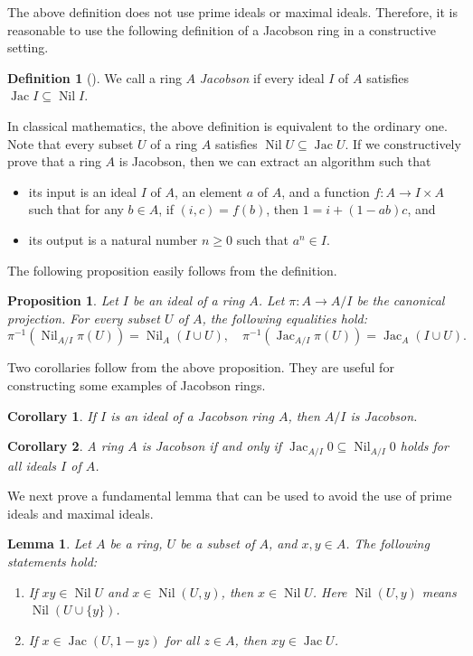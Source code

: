 \documentclass[11pt]{article}
\newtheorem{lemma}{Lemma}[section]
\newtheorem{corollary}{Corollary}[section]
\newtheorem{proposition}{Proposition}[section]
\theoremstyle{definition}
\newtheorem{definition}{Definition}[section]
\DeclareMathOperator{\Nil}{Nil}
\DeclareMathOperator{\Jac}{Jac}
\begin{document}
The above definition does not use prime ideals or maximal ideals. Therefore, it is reasonable to use the following definition of a Jacobson ring in a constructive setting.
\begin{definition}[{\cite[Section 2.4.1]{Wes18}}]
    We call a ring $A$ \emph{Jacobson} if every ideal $I$ of $A$ satisfies $\Jac I\subseteq\Nil I$.
\end{definition}
In classical mathematics, the above definition is equivalent to the ordinary one.
Note that every subset $U$ of a ring $A$ satisfies $\Nil U\subseteq\Jac U$.
If we constructively prove that a ring $A$ is Jacobson, then we can extract an algorithm such that
\begin{itemize}
    \item its input is an ideal $I$ of $A$, an element $a$ of $A$, and a function $f:A\to I\times A$ such that for any $b\in A$, if $(i,c)=f(b)$, then $1=i+(1-ab)c$, and
    \item its output is a natural number $n\ge0$ such that $a^n\in I$.
\end{itemize}
The following proposition easily follows from the definition.
\begin{proposition}\label{radical-projection}
    Let $I$ be an ideal of a ring $A$. Let $\pi:A\to A/I$ be the canonical projection. For every subset $U$ of $A$, the following equalities hold:
    \[
    \pi^{-1}(\Nil_{A/I}{\pi(U)})=\Nil_A(I\cup U),\quad \pi^{-1}(\Jac_{A/I}{\pi(U)})=\Jac_A(I\cup U).
    \]
\end{proposition}
Two corollaries follow from the above proposition. They are useful for constructing some examples of Jacobson rings.
\begin{corollary}\label{quotient-Jacobson}
    If $I$ is an ideal of a Jacobson ring $A$, then $A/I$ is Jacobson.
\end{corollary}
\begin{corollary}\label{Jacobson-iff-Jac-sub-Nil-for-all-quotients}
    A ring $A$ is Jacobson if and only if $\Jac_{A/I}0\subseteq\Nil_{A/I}0$ holds for all ideals $I$ of $A$.
\end{corollary}
We next prove a fundamental lemma that can be used to avoid the use of prime ideals and maximal ideals.
\begin{lemma}\label{radical-properties}
    Let $A$ be a ring, $U$ be a subset of $A$, and $x,y\in A$. The following statements hold:
    \begin{enumerate}
        \item If $xy\in\Nil U$ and $x\in\Nil{(U,y)}$, then $x\in\Nil U$. Here $\Nil{(U,y)}$ means $\Nil{(U\cup\{y\})}$.
        \item If $x\in\Jac(U,1-yz)$ for all $z\in A$, then $xy\in\Jac U$.
    \end{enumerate}
\end{lemma}
\end{document}
